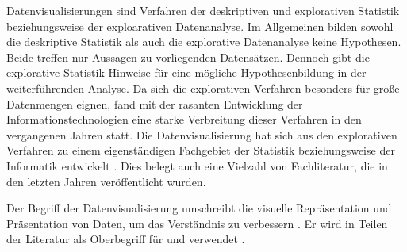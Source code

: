 %

Datenvisualisierungen sind Verfahren der deskriptiven und explorativen Statistik beziehungsweise der exploarativen Datenanalyse. 
Im Allgemeinen bilden sowohl die deskriptive Statistik als auch die explorative Datenanalyse keine Hypothesen. Beide treffen nur Aussagen zu vorliegenden Datensätzen. 
Dennoch gibt die explorative Statistik Hinweise für eine mögliche Hypothesenbildung in der weiterführenden Analyse. 
Da sich die explorativen Verfahren besonders für große Datenmengen eignen, fand mit der rasanten Entwicklung der Informationstechnologien 
eine starke Verbreitung dieser Verfahren in den vergangenen Jahren statt. Die Datenvisualisierung hat sich aus den explorativen Verfahren zu einem eigenständigen Fachgebiet der Statistik 
beziehungsweise der Informatik entwickelt \cite[vgl.][28 f.]{becker_stochastische_2016}. Dies belegt auch eine Vielzahl von Fachliteratur, die in den letzten Jahren veröffentlicht wurden.


Der Begriff der Datenvisualisierung umschreibt die visuelle Repräsentation und Präsentation von Daten, um das Verständnis zu verbessern \cite[vgl.][15 ff.]{kirk_data_2019}.
Er wird in Teilen der Literatur als Oberbegriff für  und 
 verwendet \cite[vgl.][11]{few_now_2009}.

